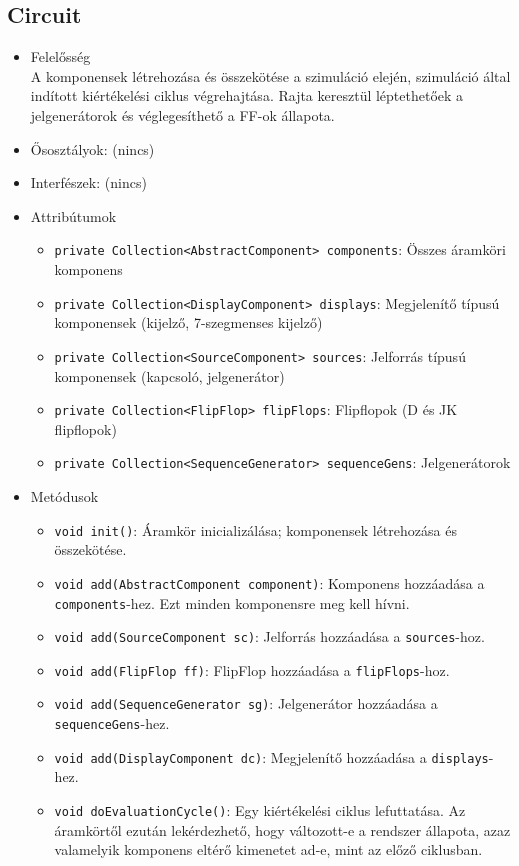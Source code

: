 \subsection{Circuit}
\begin{itemize}
\item Felelősség\\
A komponensek létrehozása és összekötése a szimuláció elején, szimuláció által indított kiértékelési ciklus végrehajtása. Rajta keresztül léptethetőek a jelgenerátorok és véglegesíthető a FF-ok állapota.
\item Ősosztályok: (nincs)
\item Interfészek: (nincs)
\item Attribútumok $\ $
\begin{itemize}
	\item \texttt{private Collection<AbstractComponent> components}: Összes áramköri komponens
	\item \texttt{private Collection<DisplayComponent> displays}: Megjelenítő típusú komponensek (kijelző, 7-szegmenses kijelző)
	\item \texttt{private Collection<SourceComponent> sources}: Jelforrás típusú komponensek (kapcsoló, jelgenerátor)
	\item \texttt{private Collection<FlipFlop> flipFlops}: Flipflopok (D és JK flipflopok)
	\item \texttt{private Collection<SequenceGenerator> sequenceGens}: Jelgenerátorok
\end{itemize}
\item Metódusok$\ $
\begin{itemize}
	\item \texttt{void init()}: Áramkör inicializálása; komponensek létrehozása és összekötése.
	\item \texttt{void add(AbstractComponent component)}: Komponens hozzáadása a \texttt{components}-hez. Ezt minden komponensre meg kell hívni.
	\item \texttt{void add(SourceComponent sc)}: Jelforrás hozzáadása a \texttt{sources}-hoz.
	\item \texttt{void add(FlipFlop ff)}: FlipFlop hozzáadása a \texttt{flipFlops}-hoz.
	\item \texttt{void add(SequenceGenerator sg)}: Jelgenerátor hozzáadása a \texttt{sequenceGens}-hez.
	\item \texttt{void add(DisplayComponent dc)}: Megjelenítő hozzáadása a \texttt{displays}-hez.
	\item \texttt{void doEvaluationCycle()}: Egy kiértékelési ciklus lefuttatása. Az áramkörtől ezután lekérdezhető, hogy változott-e a rendszer állapota, azaz valamelyik komponens eltérő kimenetet ad-e, mint az előző ciklusban.

\end{itemize}
\end{itemize}
